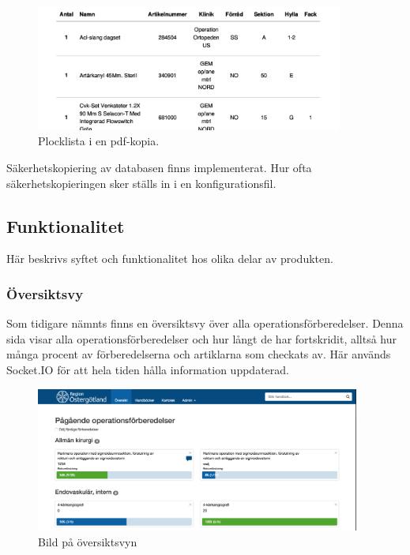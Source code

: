 \begin{figure}
  \centering
  \includegraphics[width=0.9\textwidth]{images/pdf-end.png}
  \caption{Plocklista i en pdf-kopia.}
  \label{fig:pdf-end}
\end{figure}

Säkerhetskopiering av databasen finns implementerat. Hur ofta säkerhetskopieringen sker ställs in i en konfigurationsfil.

\subsection{Funktionalitet}
Här beskrivs syftet och funktionalitet hos olika delar av produkten.

\subsubsection{Översiktsvy}
Som tidigare nämnts finns en översiktsvy över alla operationsförberedelser.
Denna sida visar alla operationsförberedelser och hur långt de har fortskridit, alltså hur många procent av förberedelserna och artiklarna som checkats av.
Här används Socket.IO för att hela tiden hålla information uppdaterad.

\begin{figure}[h!]
  \centering
  \includegraphics[width=0.95\textwidth]{images/site/overview.png}
  \caption{Bild på översiktsvyn}
  \label{fig:siteoverview}
\end{figure}


